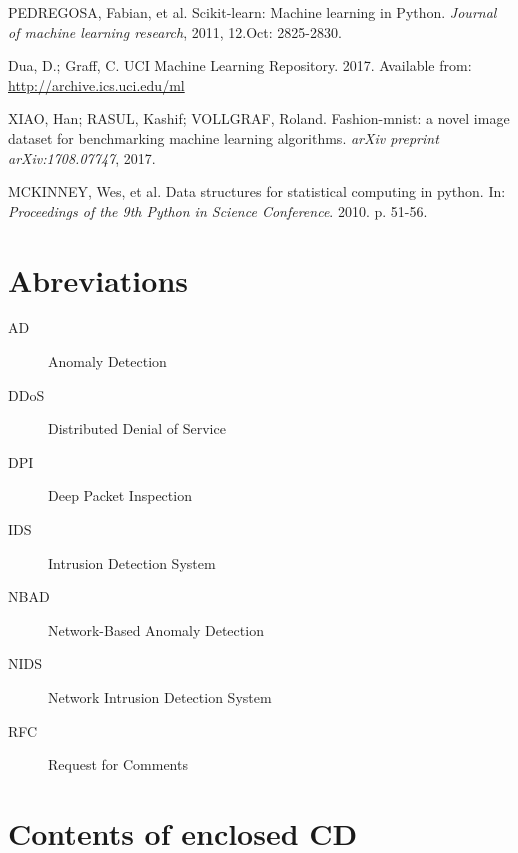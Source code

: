 \documentclass[thesis=B,english]{FITthesis}[2012/10/20]
\begin{document}
\begin{thebibliography}{99}
PEDREGOSA, Fabian, et al. Scikit-learn: Machine learning in Python. \textit{Journal of machine learning research}, 2011, 12.Oct: 2825-2830.

Dua, D.; Graff, C. UCI Machine Learning Repository. 2017. Available from: \url{http://archive.ics.uci.edu/ml}

XIAO, Han; RASUL, Kashif; VOLLGRAF, Roland. Fashion-mnist: a novel image dataset for benchmarking machine learning algorithms. \textit{arXiv preprint arXiv:1708.07747}, 2017.

MCKINNEY, Wes, et al. Data structures for statistical computing in python. In: \textit{Proceedings of the 9th Python in Science Conference}. 2010. p. 51-56.

\end{thebibliography}

\appendix

\chapter{Abreviations}
\begin{description}
    \item[AD] Anomaly Detection
    \item[DDoS] Distributed Denial of Service
    \item[DPI] Deep Packet Inspection
    \item[IDS] Intrusion Detection System
	\item[NBAD] Network-Based Anomaly Detection
	\item[NIDS] Network Intrusion Detection System
    \item[RFC] Request for Comments
\end{description}


\chapter{Contents of enclosed CD}


\begin{figure}
\end{figure}
\end{document}
